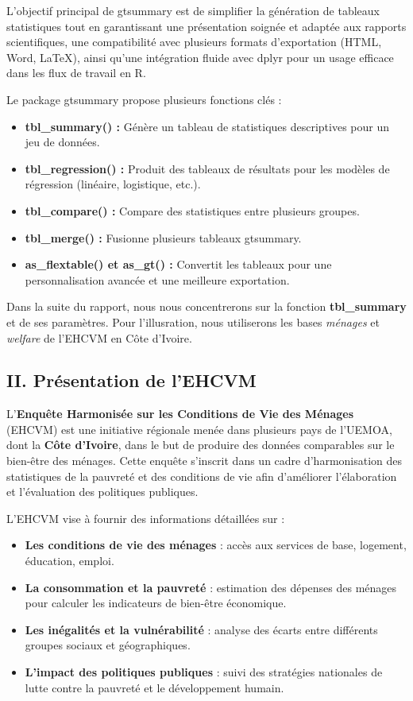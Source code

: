 \documentclass[
]{article}
\begin{document}
L'objectif principal de gtsummary est de simplifier la génération de
tableaux statistiques tout en garantissant une présentation soignée et
adaptée aux rapports scientifiques, une compatibilité avec plusieurs
formats d'exportation (HTML, Word, LaTeX), ainsi qu'une intégration
fluide avec dplyr pour un usage efficace dans les flux de travail en R.

Le package gtsummary propose plusieurs fonctions clés :

\begin{itemize}
\item
  \textbf{tbl\_summary() :} Génère un tableau de statistiques
  descriptives pour un jeu de données.
\item
  \textbf{tbl\_regression() :} Produit des tableaux de résultats pour
  les modèles de régression (linéaire, logistique, etc.).
\item
  \textbf{tbl\_compare() :} Compare des statistiques entre plusieurs
  groupes.
\item
  \textbf{tbl\_merge() :} Fusionne plusieurs tableaux gtsummary.
\item
  \textbf{as\_flextable() et as\_gt() :} Convertit les tableaux pour une
  personnalisation avancée et une meilleure exportation.
\end{itemize}

Dans la suite du rapport, nous nous concentrerons sur la fonction
\textbf{tbl\_summary} et de ses paramètres. Pour l'illusration, nous
utiliserons les bases \emph{ménages} et \emph{welfare} de l'EHCVM en
Côte d'Ivoire.

\newpage

\subsection{II. Présentation de
l'EHCVM}\label{ii.-pruxe9sentation-de-lehcvm}

L'\textbf{Enquête Harmonisée sur les Conditions de Vie des Ménages}
(EHCVM) est une initiative régionale menée dans plusieurs pays de
l'UEMOA, dont la \textbf{Côte d'Ivoire}, dans le but de produire des
données comparables sur le bien-être des ménages. Cette enquête
s'inscrit dans un cadre d'harmonisation des statistiques de la pauvreté
et des conditions de vie afin d'améliorer l'élaboration et l'évaluation
des politiques publiques.

L'EHCVM vise à fournir des informations détaillées sur :

\begin{itemize}
\item
  \textbf{Les conditions de vie des ménages} : accès aux services de
  base, logement, éducation, emploi.
\item
  \textbf{La consommation et la pauvreté} : estimation des dépenses des
  ménages pour calculer les indicateurs de bien-être économique.
\item
  \textbf{Les inégalités et la vulnérabilité} : analyse des écarts entre
  différents groupes sociaux et géographiques.
\item
  \textbf{L'impact des politiques publiques} : suivi des stratégies
  nationales de lutte contre la pauvreté et le développement humain.
\end{itemize}
\end{document}
